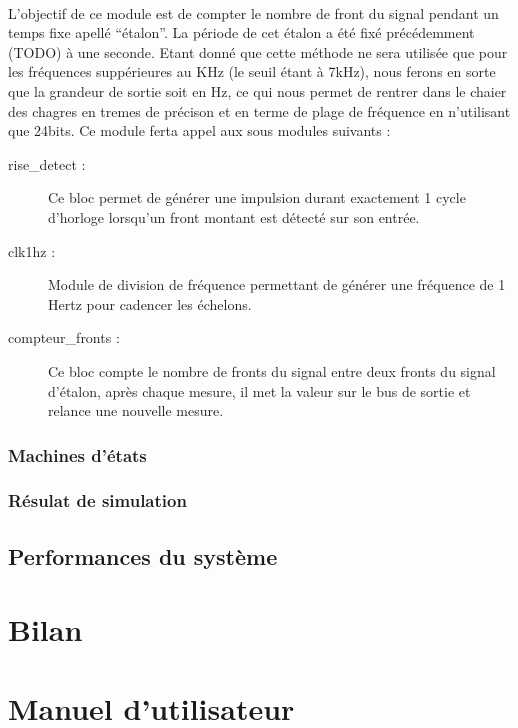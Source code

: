 \documentclass[a4paper,11pt]{article}
\begin{document}
\paragraph{} L'objectif de ce module est de compter le nombre de front du signal pendant un temps fixe apellé ``étalon''.
La période de cet étalon a été fixé précédemment (TODO) à une seconde. Etant donné que cette méthode ne sera utilisée que pour les 
fréquences suppérieures au KHz (le seuil étant à 7kHz), nous ferons en sorte que la grandeur de sortie soit en Hz, ce qui nous permet 
de rentrer dans le chaier des chagres en tremes de précison et en terme de plage de fréquence en n'utilisant que 24bits. Ce module 
ferta appel aux sous modules suivants :

\begin{description}
  \item[rise\_detect : ] Ce bloc permet de générer une impulsion durant exactement 1 cycle d'horloge lorsqu'un front montant est détecté
  sur son entrée.
  \item[clk1hz : ] Module de division de fréquence permettant de générer une fréquence de 1 Hertz pour cadencer les échelons.
  \item[compteur\_fronts : ] Ce bloc compte le nombre de fronts du signal entre deux fronts du signal d'étalon, après chaque mesure,
  il met la valeur sur le bus de sortie et relance une nouvelle mesure.
\end{description}


  \subsubsection{Machines d'états}
  \subsubsection{Résulat de simulation}

\subsection{Performances du système}



\newpage
\section{Bilan}

\newpage
\appendix
\section{Manuel d'utilisateur}
\end{document}
